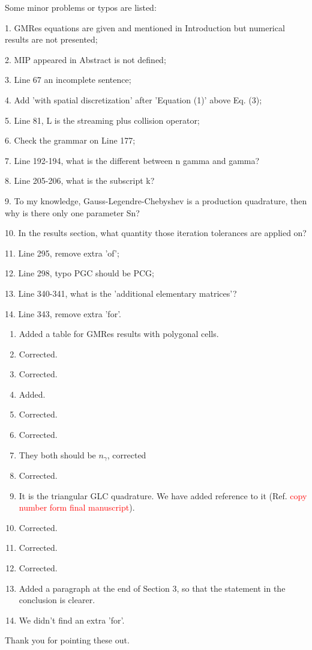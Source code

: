 \documentclass{article}
\begin{document}
{
\color{blue}
\noindent
Some minor problems or typos are listed:

1. GMRes equations are given and mentioned in Introduction but numerical results are not presented;

2. MIP appeared in Abstract is not defined;

3. Line 67 an incomplete sentence;

4. Add 'with spatial discretization' after 'Equation (1)' above Eq. (3);

5. Line 81, L is the streaming plus collision operator;

6. Check the grammar on Line 177;

7. Line 192-194, what is the different between n gamma and gamma?

8. Line 205-206, what is the subscript k?

9. To my knowledge, Gauss-Legendre-Chebyshev is a production quadrature, then why is there only one parameter Sn?

10. In the results section, what quantity those iteration tolerances are applied on?

11. Line 295, remove extra 'of';

12. Line 298, typo PGC should be PCG;

13. Line 340-341, what is the 'additional elementary matrices'?

14. Line 343, remove extra 'for'.}



\begin{enumerate}
\item Added a table for GMRes results with polygonal cells.
\item Corrected.
\item Corrected.
\item Added.
\item Corrected.
\item Corrected.
\item They both should be $n_\gamma$, corrected
\item Corrected.
\item It is the triangular GLC quadrature. We have added reference to it (Ref. \textcolor{red}{copy number form final manuscript}).
\item Corrected.
\item Corrected.
\item Corrected.
\item Added a paragraph at the end of Section 3, so that the statement in the conclusion is clearer.
\item We didn't find an extra 'for'.
\end{enumerate}

\noindent 
Thank you for pointing these out.
\end{document}
